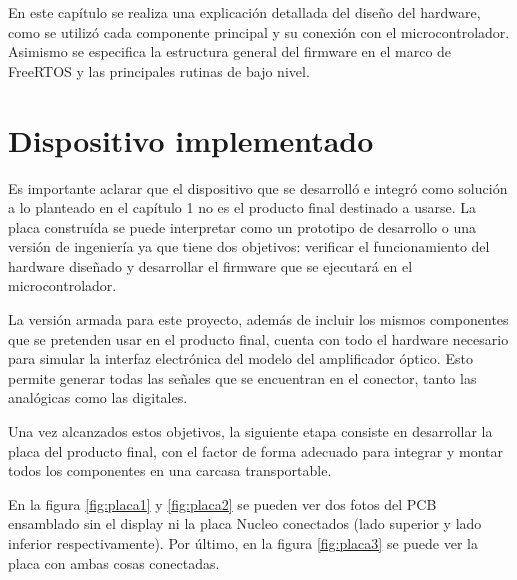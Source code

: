 
En este capítulo se realiza una explicación detallada del diseño del hardware, como se utilizó cada componente principal y su conexión con el microcontrolador. Asimismo se especifica la estructura general del firmware en el marco de FreeRTOS y las principales rutinas de bajo nivel.

\section{Dispositivo implementado}

Es importante aclarar que el dispositivo que se desarrolló e integró como solución a lo planteado en el capítulo 1 no es el producto final destinado a usarse. La placa construída se puede interpretar como un prototipo de desarrollo o una versión de ingeniería ya que tiene dos objetivos: verificar el funcionamiento del hardware diseñado y desarrollar el firmware que se ejecutará en el microcontrolador. 

La versión armada para este proyecto, además de incluir los mismos componentes que se pretenden usar en el producto final, cuenta con todo el hardware necesario para simular la interfaz electrónica del modelo del amplificador óptico. Esto permite generar todas las señales que se encuentran en el conector, tanto las analógicas como las digitales.

Una vez alcanzados estos objetivos, la siguiente etapa consiste en desarrollar la placa del producto final, con el factor de forma adecuado para integrar y montar todos los componentes en una carcasa transportable. 

En la figura \ref{fig:placa1} y \ref{fig:placa2} se pueden ver dos fotos del PCB ensamblado sin el display ni la placa Nucleo conectados (lado superior y lado inferior respectivamente). Por último, en la figura \ref{fig:placa3} se puede ver la placa con ambas cosas conectadas.

